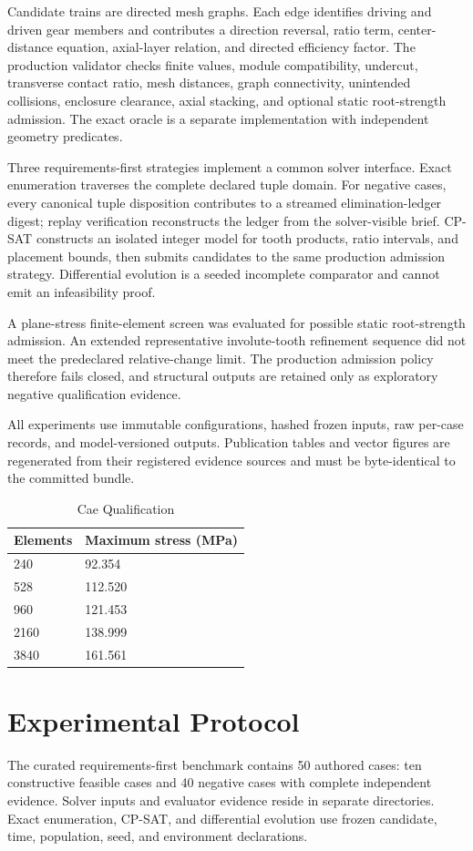 \documentclass[preprint,12pt]{elsarticle}
\begin{document}
Candidate trains are directed mesh graphs. Each edge identifies driving and driven gear members and contributes a direction reversal, ratio term, center-distance equation, axial-layer relation, and directed efficiency factor. The production validator checks finite values, module compatibility, undercut, transverse contact ratio, mesh distances, graph connectivity, unintended collisions, enclosure clearance, axial stacking, and optional static root-strength admission. The exact oracle is a separate implementation with independent geometry predicates.

Three requirements-first strategies implement a common solver interface. Exact enumeration traverses the complete declared tuple domain. For negative cases, every canonical tuple disposition contributes to a streamed elimination-ledger digest; replay verification reconstructs the ledger from the solver-visible brief. CP-SAT constructs an isolated integer model for tooth products, ratio intervals, and placement bounds, then submits candidates to the same production admission strategy. Differential evolution is a seeded incomplete comparator and cannot emit an infeasibility proof.

A plane-stress finite-element screen was evaluated for possible static root-strength admission. An extended representative involute-tooth refinement sequence did not meet the predeclared relative-change limit. The production admission policy therefore fails closed, and structural outputs are retained only as exploratory negative qualification evidence.

All experiments use immutable configurations, hashed frozen inputs, raw per-case records, and model-versioned outputs. Publication tables and vector figures are regenerated from their registered evidence sources and must be byte-identical to the committed bundle.

\begin{table}[htbp]
\centering
\caption{Cae Qualification}
\small
\begin{tabular}{ll}
\textbf{Elements} & \textbf{Maximum stress (MPa)} \\
\hline
240 & 92.354 \\
528 & 112.520 \\
960 & 121.453 \\
2160 & 138.999 \\
3840 & 161.561 \\
\end{tabular}
\end{table}
\section{Experimental Protocol}
The curated requirements-first benchmark contains 50 authored cases: ten constructive feasible cases and 40 negative cases with complete independent evidence. Solver inputs and evaluator evidence reside in separate directories. Exact enumeration, CP-SAT, and differential evolution use frozen candidate, time, population, seed, and environment declarations.
\end{document}

